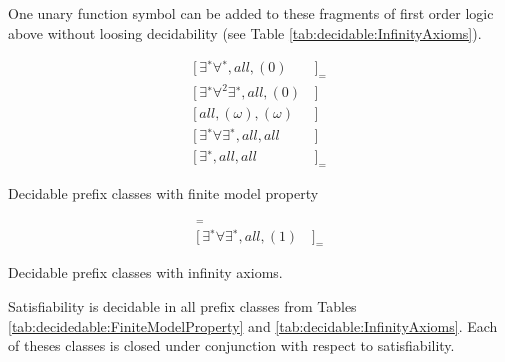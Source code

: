 \begin{remark}
	One unary function symbol can be added to these fragments of first order logic above 
	without loosing decidability (see Table \vref{tab:decidable:InfinityAxioms}).
\end{remark}


\begin{table}[hbt]
	\begin{align*}
	[\,\exists^{∗}\forall^{∗}, all, (0)&\,]_{=} \tag{Bernays, Schönfinkel 1928, Ramsey 1932}
	\\
	[\,\exists^{∗}\forall^2\exists^{∗} , all, (0)&\,] \tag{Gödel 1932, Kalmár 1933, Schütte 1934}
	\\
	[\,all, (\omega), (\omega)&\,] \tag{Löb 1967, Gurevich 1969}
	\\
	[\,\exists^{∗}\forall\exists^{∗}, all, all&\,] \tag{Gurevich 1973}
	\\
	[\,\exists^{∗}, all, all&\,]_{=} \tag{Gurevich 1976}
	\end{align*}
	\caption[Decidable prefix classes (finite)]{Decidable prefix classes with finite model property }
	\label{tab:decidedable:FiniteModelProperty}
\end{table}

\begin{table}[hbt]
	\begin{align*}
	[\,all, (\omega), (1)&\,]_{=} \tag{Rabin 1969} 
	\\
	[\,\exists^{∗}\forall\exists^{∗}, all, (1)&\,]_{=} \tag{Shelah 1977}
	\end{align*}
	\caption[Decidable prefix classes (infinite)]{Decidable prefix classes with infinity axioms. }
	\label{tab:decidable:InfinityAxioms}
\end{table}

\begin{lemma}
	Satisfiability is decidable \cite{MR1482227} in all prefix classes from Tables 
	\ref{tab:decidedable:FiniteModelProperty} and \ref{tab:decidable:InfinityAxioms}.
	Each of theses classes is closed under conjunction with respect to satisfiability.
\end{lemma}



